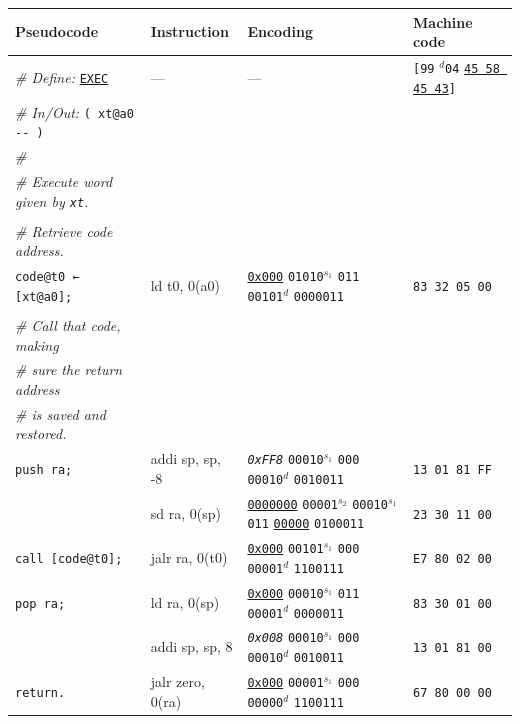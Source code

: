 \documentclass[a4paper,12pt,final]{article}
\begin{document}
\begin{table}[!htbp] \begin{adjustwidth}{-1cm}{-1cm} \fontsize{8}{9.600000}\selectfont
\begin{center}
\begin{tabular}{l|ll|l}
\textbf{Pseudocode} & \textbf{Instruction} & \textbf{Encoding} & \textbf{Machine code}\\[0pt]
\hline
\emph{\# Define:} \uline{\texttt{EXEC}} & --- & --- & \texttt{[99} \(^{d}\)​\texttt{04} \uline{\texttt{45 58 45 43}}​\texttt{]}\\[0pt]
\emph{\# In/Out:} \texttt{( xt@a0 -{}-{} )} &  &  & \\[0pt]
\emph{\#} &  &  & \\[0pt]
\emph{\# Execute word given by \texttt{xt}.} &  &  & \\[0pt]
 &  &  & \\[0pt]
\emph{\# Retrieve code address.} &  &  & \\[0pt]
\texttt{code@t0 ← [xt@a0];} & ld t0, 0(a0) & \uline{\texttt{0x000}}                    \texttt{01010}​\(^{s_{1}}\) \texttt{011} \texttt{00101}​\(^{d}\)  \texttt{0000011} & \texttt{83 32 05 00}\\[0pt]
 &  &  & \\[0pt]
\emph{\# Call that code, making} &  &  & \\[0pt]
\emph{\# sure the return address} &  &  & \\[0pt]
\emph{\# is saved and restored.} &  &  & \\[0pt]
\texttt{push ra;} & addi sp, sp, -8 & \emph{\texttt{0xFF8}}                    \texttt{00010}​\(^{s_{1}}\) \texttt{000} \texttt{00010}​\(^{d}\)  \texttt{0010011} & \texttt{13 01 81 FF}\\[0pt]
 & sd ra, 0(sp) & \uline{\texttt{0000000}} \texttt{00001}​\(^{s_{2}}\) \texttt{00010}​\(^{s_{1}}\) \texttt{011} \uline{\texttt{00000}} \texttt{0100011} & \texttt{23 30 11 00}\\[0pt]
\texttt{call [code@t0];} & jalr ra, 0(t0) & \uline{\texttt{0x000}}                    \texttt{00101}​\(^{s_{1}}\) \texttt{000} \texttt{00001}​\(^{d}\)  \texttt{1100111} & \texttt{E7 80 02 00}\\[0pt]
\texttt{pop ra;} & ld ra, 0(sp) & \uline{\texttt{0x000}}                    \texttt{00010}​\(^{s_{1}}\) \texttt{011} \texttt{00001}​\(^{d}\)  \texttt{0000011} & \texttt{83 30 01 00}\\[0pt]
 & addi sp, sp, 8 & \emph{\texttt{0x008}}                    \texttt{00010}​\(^{s_{1}}\) \texttt{000} \texttt{00010}​\(^{d}\)  \texttt{0010011} & \texttt{13 01 81 00}\\[0pt]
\texttt{return.} & jalr zero, 0(ra) & \uline{\texttt{0x000}}                    \texttt{00001}​\(^{s_{1}}\) \texttt{000} \texttt{00000}​\(^{d}\)  \texttt{1100111} & \texttt{67 80 00 00}\\[0pt]
\end{tabular}


\end{center}
\end{adjustwidth}
\end{table}
\end{document}
